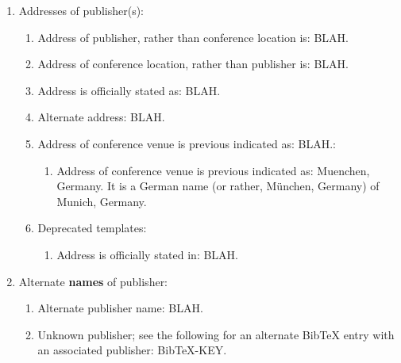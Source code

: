 \documentclass[letter,12pt]{article}
\begin{document}
\begin{enumerate}
\begin{enumerate}
\begin{enumerate}
		\item 20X1, 20X2, and 20X3 are the alternate years of publication, cited by: SOURCES.
		\item 20XY is the alternate year of publication, cited by: SOURCE.
		\item Possible year of publication: 20XY.
		\item Year of publication may be incorrect: 20XY.
		\item Date of publication may be incorrect: MONTH, DAY, YEAR.
		\end{enumerate}
	\item Addresses of publisher(s): \vspace{-0.2cm}
		\begin{enumerate} \itemsep -2pt
		\item Address of publisher, rather than conference location is: BLAH.
		\item Address of conference location, rather than publisher is: BLAH.
		\item Address is officially stated as: BLAH.
		\item Alternate address: BLAH.
		\item Address of conference venue is previous indicated as: BLAH.: \vspace{-0.1cm}
			\begin{enumerate} \itemsep -1pt
			\item Address of conference venue is previous indicated as: Muenchen, Germany. It is a German name (or rather, M{\"{u}}nchen, Germany) of Munich, Germany.
			\end{enumerate}
		\item Deprecated templates: \vspace{-0.1cm}
			\begin{enumerate} \itemsep -1pt
			\item Address is officially stated in: BLAH.
			\end{enumerate}
		\end{enumerate}
	\item Alternate {\bf names} of publisher: \vspace{-0.2cm}
		\begin{enumerate} \itemsep -2pt
		\item Alternate publisher name: BLAH.
		\item Unknown publisher; see the following for an alternate BibTeX entry with an associated publisher: BibTeX-KEY.

\end{enumerate}
\end{enumerate}
\end{enumerate}
\end{document}
